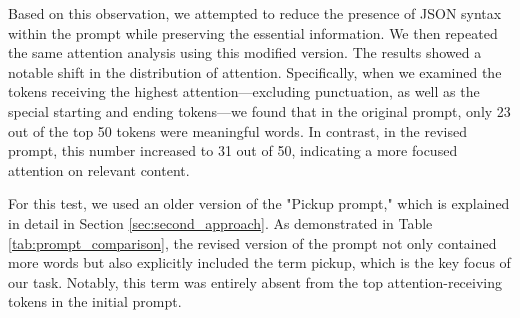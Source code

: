 Based on this observation, we attempted to reduce the presence of JSON syntax within
the prompt while preserving the essential information. We then repeated the same
attention analysis using this modified version. The results showed a notable shift
in the distribution of attention. Specifically, when we examined the tokens receiving
the highest attention—excluding punctuation, as well as the special starting and
ending tokens—we found that in the original prompt, only 23 out of the top 50 tokens
were meaningful words. In contrast, in the revised prompt, this number increased
to 31 out of 50, indicating a more focused attention on relevant content.

For this test, we used an older version of the "Pickup prompt," which is explained
in detail in Section \ref{sec:second_approach}. As demonstrated in Table
\ref{tab:prompt_comparison}, the revised version of the prompt not only contained
more words but also explicitly included the term pickup, which is the key focus
of our task. Notably, this term was entirely absent from the top attention-receiving
tokens in the initial prompt.

